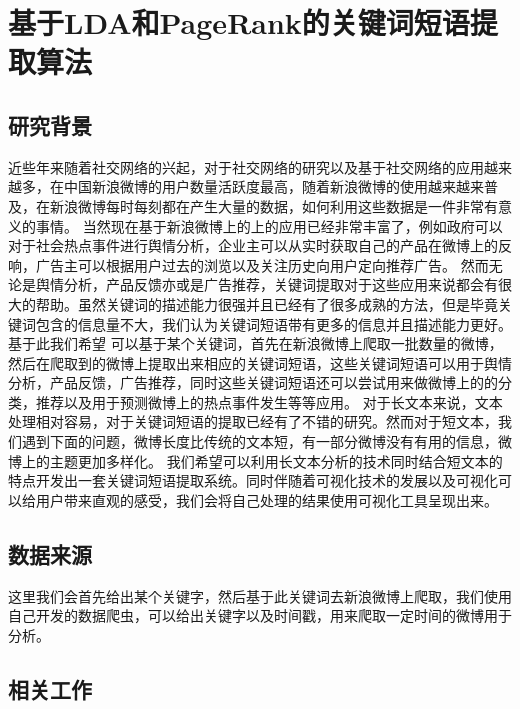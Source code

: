\documentclass[master]{njuthesis}
\begin{document}
\chapter{基于LDA和PageRank的关键词短语提取算法}\label{chapter_smallworld}
\section{研究背景}

近些年来随着社交网络的兴起，对于社交网络的研究以及基于社交网络的应用越来越多，在中国新浪微博的用户数量活跃度最高，随着新浪微博的使用越来越来普及，在新浪微博每时每刻都在产生大量的数据，如何利用这些数据是一件非常有意义的事情。
当然现在基于新浪微博上的上的应用已经非常丰富了，例如政府可以对于社会热点事件进行舆情分析，企业主可以从实时获取自己的产品在微博上的反响，广告主可以根据用户过去的浏览以及关注历史向用户定向推荐广告。
然而无论是舆情分析，产品反馈亦或是广告推荐，关键词提取对于这些应用来说都会有很大的帮助。虽然关键词的描述能力很强并且已经有了很多成熟的方法，但是毕竟关键词包含的信息量不大，我们认为关键词短语带有更多的信息并且描述能力更好。基于此我们希望
可以基于某个关键词，首先在新浪微博上爬取一批数量的微博，然后在爬取到的微博上提取出来相应的关键词短语，这些关键词短语可以用于舆情分析，产品反馈，广告推荐，同时这些关键词短语还可以尝试用来做微博上的的分类，推荐以及用于预测微博上的热点事件发生等等应用。
对于长文本来说，文本处理相对容易，对于关键词短语的提取已经有了不错的研究。然而对于短文本，我们遇到下面的问题，微博长度比传统的文本短，有一部分微博没有有用的信息，微博上的主题更加多样化。
我们希望可以利用长文本分析的技术同时结合短文本的特点开发出一套关键词短语提取系统。同时伴随着可视化技术的发展以及可视化可以给用户带来直观的感受，我们会将自己处理的结果使用可视化工具呈现出来。

\section{数据来源}

这里我们会首先给出某个关键字，然后基于此关键词去新浪微博上爬取，我们使用自己开发的数据爬虫，可以给出关键字以及时间戳，用来爬取一定时间的微博用于分析。

\section{相关工作}
\end{document}
